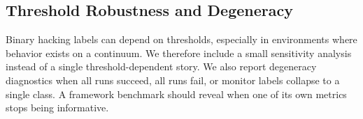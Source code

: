 \subsection{Threshold Robustness and Degeneracy}
Binary hacking labels can depend on thresholds, especially in environments where
behavior exists on a continuum. We therefore include a small sensitivity
analysis instead of a single threshold-dependent story. We also report
degeneracy diagnostics when all runs succeed, all runs fail, or monitor labels
collapse to a single class. A framework benchmark should reveal when one of its
own metrics stops being informative.
